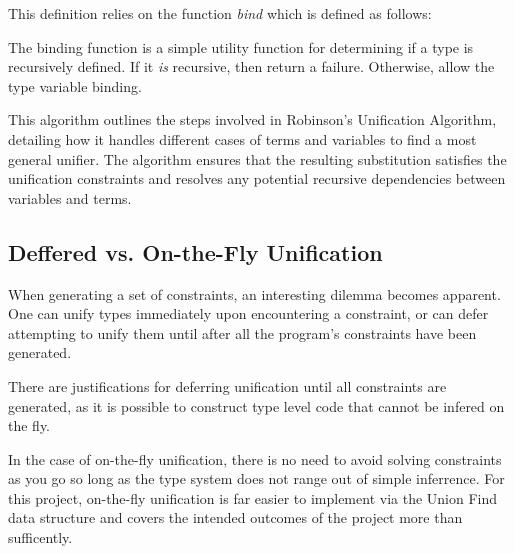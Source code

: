 \documentclass{l4proj}
\begin{document}
This definition relies on the function \emph{bind} which is defined as follows:
\begin{center}
\begin{minipage}{0.8\linewidth}%
\begin{algorithm}[H]
    \DontPrintSemicolon
\caption{The binding function is a simple utility function for determining if a type is recursively defined. If it \emph{is} recursive, then return a failure. Otherwise, allow the type variable binding.}
\end{algorithm}
\end{minipage}
\end{center}

This algorithm outlines the steps involved in Robinson's Unification Algorithm, detailing how it handles different cases of terms and variables to find a most general unifier.
The algorithm ensures that the resulting substitution satisfies the unification constraints and resolves any potential recursive dependencies between variables and terms.

\subsection*{Deffered vs. On-the-Fly Unification}

When generating a set of constraints, an interesting dilemma becomes apparent.
One can unify types immediately upon encountering a constraint, or can defer attempting to unify them until after all the program's constraints have been generated.

There are justifications for deferring unification until all constraints are generated, as it is possible to construct type level code that cannot be infered on the fly.

In the case of on-the-fly unification, there is no need to avoid solving constraints as you go so long as the type system does not range out of simple inferrence.
For this project, on-the-fly unification is far easier to implement via the Union Find data structure and covers the intended outcomes of the project more than sufficently.


\end{document}
